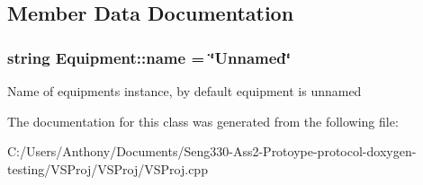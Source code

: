 \subsection{Member Data Documentation}
\hypertarget{class_equipment_a65c3c95bb543fd763fe6bdf7587c1d33}{}
\subsubsection[{name}]{\setlength{\rightskip}{0pt plus 5cm}string Equipment\+::name = \char`\"{}Unnamed\char`\"{}}\label{class_equipment_a65c3c95bb543fd763fe6bdf7587c1d33}
Name of equipments instance, by default equipment is unnamed 

The documentation for this class was generated from the following file\+:\begin{DoxyCompactItemize}
\item 
C\+:/\+Users/\+Anthony/\+Documents/\+Seng330-\/\+Ass2-\/\+Protoype-\/protocol-\/doxygen-\/testing/\+V\+S\+Proj/\+V\+S\+Proj/V\+S\+Proj.\+cpp\end{DoxyCompactItemize}

